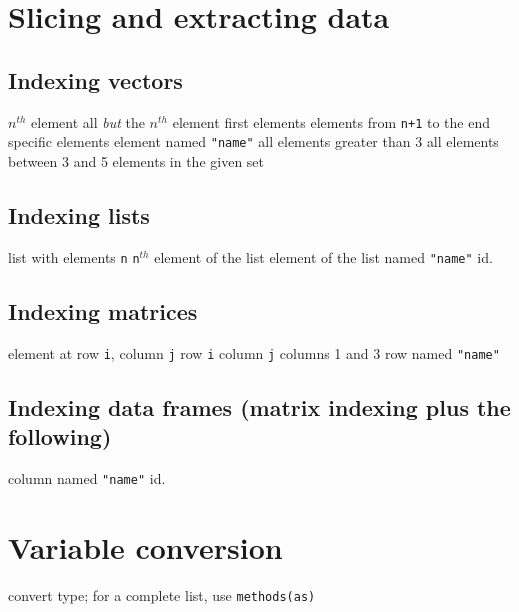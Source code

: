 \section{Slicing and extracting data}{}

\subsection{Indexing vectors}{}
	{ $ n^{th} $ element}
	{all {\it but} the $ n^{th} $ element}
	{first elements}
	{elements from {\tt n+1} to the end}
	{specific elements}
	{element named {\tt "name"}}
	{all elements greater than 3}
	{all elements between 3 and 5}
	{elements in the given set}

\subsection{Indexing lists}{}

	{list with elements {\tt n}}
	{{\tt n}$^{th}$ element of the list}
	{element of the list named {\tt "name"}}
	{id.}


\subsection{Indexing matrices}{}

	{element at row {\tt i}, column {\tt j}}
	{row {\tt i}}
	{column {\tt j}}
	{columns 1 and 3}
	{row named {\tt "name"}}

\subsection{Indexing data frames (matrix indexing plus the following)}{}

	{column named {\tt "name"}}
	{id.}

\section{Variable conversion}{}

	{convert type; for a complete list, use {\tt methods(as)}}

